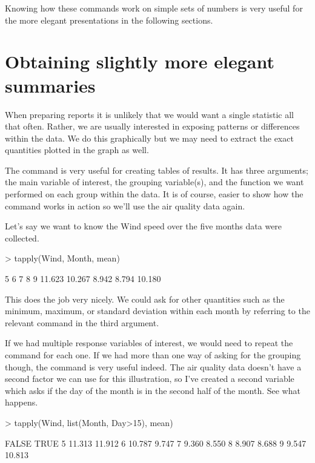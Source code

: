 Knowing how these commands work on simple sets of numbers is very useful for the more elegant presentations in the following sections. 
 
\section{Obtaining slightly more elegant summaries} 
 
When preparing reports it is unlikely that we would want a single statistic all that often. Rather, we are usually interested in exposing patterns or differences within the data. We do this graphically but we may need to extract the exact quantities plotted in the graph as well. 
 
The  command is very useful for creating tables of results. It has three arguments; the main variable of interest, the grouping variable(s), and the function we want performed on each group within the data. It is of course, easier to show how the  command works in action so we'll use the air quality data again. 
 
Let's say we want to know the  Wind speed over the five months data were collected. 
\begin{Schunk}
\begin{Sinput}
> tapply(Wind, Month, mean) 
\end{Sinput}
\begin{Soutput}
     5      6      7      8      9 
11.623 10.267  8.942  8.794 10.180 
\end{Soutput}
\end{Schunk}
This does the job very nicely. We could ask for other quantities such as the minimum, maximum, or standard deviation within each month by referring to the relevant \R{} command in the third argument. 
 
If we had multiple response variables of interest, we would need to repeat the command for each one. If we had more than one way of asking for the grouping though, the  command is very useful indeed. The air quality data doesn't have a second factor we can use for this illustration, so I've created a second variable which asks if the day of the month is in the second half of the month. See what happens. 
\begin{Schunk}
\begin{Sinput}
> tapply(Wind, list(Month, Day>15), mean) 
\end{Sinput}
\begin{Soutput}
   FALSE   TRUE
5 11.313 11.912
6 10.787  9.747
7  9.360  8.550
8  8.907  8.688
9  9.547 10.813
\end{Soutput}
\end{Schunk}
 
